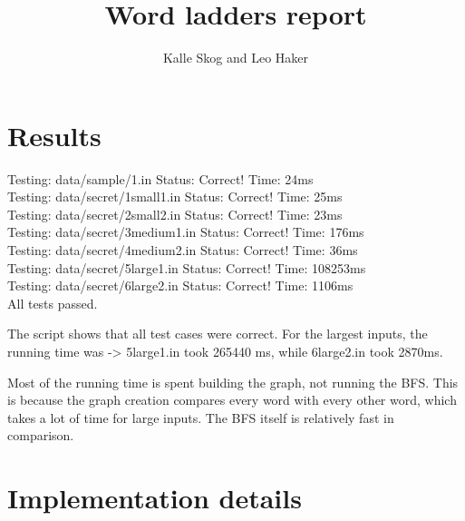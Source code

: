 \documentclass{article}
\title{Word ladders report}
\author{Kalle Skog and Leo Haker}
\begin{document}
  \maketitle

  \section{Results}

Testing: data/sample/1.in
Status: Correct!
Time: 24ms\\

Testing: data/secret/1small1.in
Status: Correct!
Time: 25ms\\

Testing: data/secret/2small2.in
Status: Correct!
Time: 23ms\\

Testing: data/secret/3medium1.in
Status: Correct!
Time: 176ms\\

Testing: data/secret/4medium2.in
Status: Correct!
Time: 36ms\\

Testing: data/secret/5large1.in
Status: Correct!
Time: 108253ms \\

Testing: data/secret/6large2.in
Status: Correct!
Time: 1106ms
\\


All tests passed.


The script shows that all test cases were correct.  
For the largest inputs, the running time was -> 5large1.in took 265440 ms, while 6large2.in took 2870ms.

Most of the running time is spent building the graph, not running the BFS. This is because the graph creation compares every word with every other word, which takes a lot of time for large inputs. The BFS itself is relatively fast in comparison.

\section{Implementation details}

\end{document}
